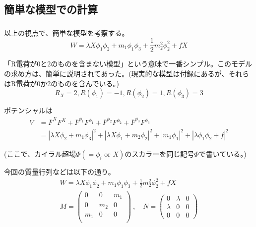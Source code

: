 \documentclass[
  unicode,a4paper,9pt,
  xcolor = {dvipsnames,svgnames},
  hyperref ={colorlinks=true,citecolor=Navy,linkcolor=NavyBlue,urlcolor=purple},
  ja=standard,lualatex
]{beamer}
\begin{document}
\subsection{簡単な模型での計算}

\begin{frame}
  \frametitle{\subsecname}

  以上の視点で、簡単な模型を考察する。
  \begin{equation}
    W=\lambda X\phi_{1}\phi_{2}+m_{1}\phi_{1}\phi_{3}+\frac{1}{2}m_{2}^2\phi_{2}^2+fX
    \nonumber
  \end{equation}

  「R電荷が0と2のものを含まない模型」という意味で一番シンプル。このモデルの求め方は、簡単に説明されてあった。(現実的な模型は付録にあるが、それらはR電荷が0か2のものを含んでいる。)
  $$
    R_{X}=2, R(\phi_{1})=-1, R(\phi_{2})=1, R(\phi_{3})=3
  $$

ポテンシャルは
\begin{align}
  V
  &=
  \bar{F}^{X}F^{X}
  +
  \bar{F}^{\phi_{1}}F^{\phi_{1}}
  +
  \bar{F}^{\phi_{2}}F^{\phi_{2}}
  +
  \bar{F}^{\phi_{3}}F^{\phi_{3}}
  \nonumber
  \\
  &=
  |\lambda X\phi_{2}+m_{1}\phi_{3}|^2
  +
  |\lambda X\phi_{1}+m_{2}\phi_{2}|^2
  +
  |m_{1}\phi_{1}|^2
  +
  |\lambda \phi_{1}\phi_{2}+f|^2
  \nonumber
\end{align}

(ここで、カイラル超場$\Phi(=\phi_{i}\textrm{\ or\ }X)$のスカラーを同じ記号$\Phi$で書いている。)

\end{frame}

\begin{frame}

  今回の質量行列などは以下の通り。
  \begin{gather}
    W=\lambda X\phi_{1}\phi_{2}+m_{1}\phi_{1}\phi_{3}+\frac{1}{2}m_{2}^2\phi_{2}^2+fX
    \label{eqn:eg}
    \\
    M
    =
    \begin{pmatrix}
      0 & 0 & m_{1} \\
      0 & m_{2} & 0 \\
      m_{1} & 0 & 0 \\
    \end{pmatrix}
    \ ,\quad
    N
    =
    \begin{pmatrix}
      0 & \lambda & 0 \\
      \lambda & 0 & 0 \\
      0 & 0 & 0
    \end{pmatrix}
  \end{gather}

  



  

\end{frame}
\end{document}
